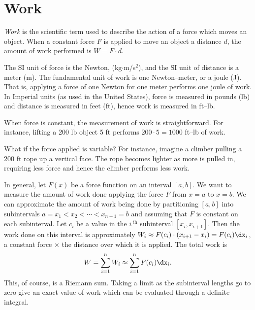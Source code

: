 \section{Work}\label{sec:work}

\textit{Work} is the scientific term used to describe the action of a force which moves an object. When a constant force $F$ is applied to move an object a distance $d$, the amount of work performed is $W=F\cdot d$. 

The SI unit of force is the Newton, (kg$\cdot$m/s$^2$), and the SI unit of distance is a meter (m). The fundamental unit of work is one Newton--meter, or a joule (J). That is, applying a force of one Newton for one meter performs one joule of work. In Imperial units (as used in the United States), force is measured in pounds (lb) and distance is measured in feet (ft), hence work is measured in ft--lb. 


When force is constant, the measurement of work is straightforward. For instance, lifting a 200 lb object 5 ft performs $200\cdot 5 = 1000$ ft--lb of work. 

What if the force applied is variable? For instance, imagine a climber pulling a 200 ft rope up a vertical face. The rope becomes lighter as more is pulled in, requiring less force and hence the climber performs less work.

In general, let $F(x)$ be a force function on an interval $[a,b]$. We want to measure the amount of work done applying the force $F$ from $x=a$ to $x=b$. We can approximate the amount of work being done by partitioning $[a,b]$ into subintervals $a=x_1<x_2 <\cdots <x_{n+1}=b$ and assuming that $F$ is constant on each subinterval. Let $c_i$ be a value in the $i\,^{\text{th}}$ subinterval $[x_i,x_{i+1}]$. Then the work done on this interval is approximately $W_i\approx F(c_i)\cdot(x_{i+1}-x_i) = F(c_i)\dx_i$, a constant force $\times$ the distance over which it is applied. The total work is 
\[
 W = \sum_{i=1}^n W_i \approx \sum_{i=1}^n F(c_i)\dx_i.
\]
This, of course, is a Riemann sum. Taking a limit as the subinterval lengths go to zero give an exact value of work which can be evaluated through a definite integral.

